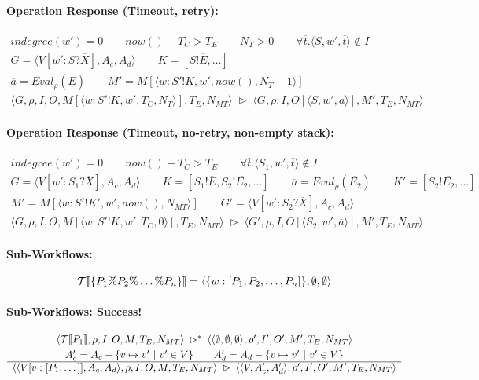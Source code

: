 \documentclass{llncs}
\newcommand{\sem}[1]{[ \! [ #1 ] \! ]}
\newcommand{\tuple}[1]{\langle #1 \rangle}
\newcommand{\trad}[1]{{\cal T}\sem{ #1 }}
\newcommand{\setof}[1]{\{ #1 \} }
\newcommand{\eval}[2]{\mathit{Eval}_{#1}(#2)}
\def\tr{\rhd}    %
\newcommand{\pfrule}[2]{\begin{array}{c} #1 \\ \hline #2 \end{array}}
\begin{document}
\paragraph{Operation Response (Timeout, retry):}
$$
\pfrule{
\mathit{indegree}(w') = 0 \qquad
\mathit{now()} - T_C > T_E \qquad
N_T > 0 \qquad
\forall \overline{t}. \tuple{S, w', \overline{t}} \not\in I \\[1mm]
G = \tuple{V[w' : S?\overline{X}], A_c, A_d} \qquad
K = [S!\overline{E},\dots] \\[1mm]
\overline{a} = \eval{\rho}{\overline{E}} \qquad
M'= M[\tuple{w:S'!K, w', \mathit{now()}, N_{T}-1}]
}{
\tuple{G,\rho, I, O, M[\tuple{w:S'!K, w', T_C, N_{T}}], T_E, N_{MT}}
\; \tr \;
\tuple{G,\rho, I, O[\tuple{S, w', \overline{a}}], M', T_E, N_{MT}}
}
$$


\paragraph{Operation Response (Timeout, no-retry, non-empty stack):}
$$
\pfrule{
\mathit{indegree}(w') = 0 \qquad
\mathit{now()} - T_C > T_E \qquad
\forall \overline{t}. \tuple{S_1, w', \overline{t}} \not\in I \\[1mm]
G = \tuple{V[w' : S_1?\overline{X}], A_c, A_d} \qquad
K = [S_1!\overline{E}, S_2!\overline{E_2},\dots] \qquad
\overline{a} = \eval{\rho}{\overline{E_2}} \qquad
K' = [S_2!\overline{E_2},\dots] \\[1mm]
M'= M[\tuple{w:S'!K', w', \mathit{now()}, N_{MT}}] \qquad
G' = \tuple{V[w' : S_2?\overline{X}], A_c, A_d}
}{
\tuple{G,\rho, I, O, M[\tuple{w:S'!K, w', T_C, 0}], T_E, N_{MT}}
\; \tr \;
\tuple{G',\rho, I, O[\tuple{S_2, w', \overline{a}}], M', T_E, N_{MT}}
}
$$


\paragraph{Sub-Workflows:}

$$
\trad{\setof{P_1\% P_2\% \dots \% P_n}}  =  \tuple{\setof{w:[P_1, P_2, \dots, P_n]}, \emptyset, \emptyset}
$$



\paragraph{Sub-Workflows: Success!}
$$
\pfrule{
\tuple{\trad{P_1},\rho, I, O, M, T_E, N_{MT}}
\; \tr^* \;
\tuple{\tuple{\emptyset, \emptyset, \emptyset},\rho', I', O', M', T_E, N_{MT}} \\[1mm]
A'_c = A_c - \setof{v\mapsto v' \ | \ v' \in V} \qquad
A'_d = A_d - \setof{v\mapsto v' \ | \ v' \in V}
}{
\tuple{\tuple{V[v:[P_1,\dots]], A_c, A_d},\rho, I, O, M, T_E, N_{MT}}
\; \tr \;
\tuple{\tuple{V, A'_c, A'_d},\rho', I', O', M', T_E, N_{MT}}
}
$$
\end{document}
